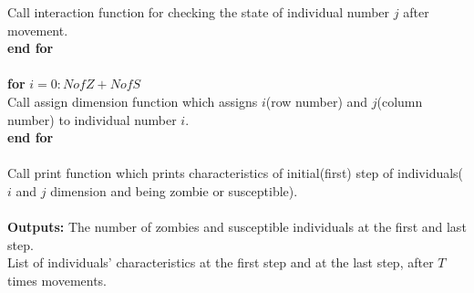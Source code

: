 \documentclass[12pt]{article}
\newcommand\tab[1][1cm]{\hspace*{#1}}
\begin{document}
\tab Call interaction function for checking the state of individual number $j$ \tab after movement.\\
\textbf{end for}\\\\
\textbf{for} $i=0:NofZ+NofS$\\
\tab Call assign dimension function which assigns $i$(row number) and $j$(column \tab number) to individual number $i$.\\
\textbf{end for}\\\\
Call print function which prints characteristics of initial(first) step of individuals($i$ and $j$ dimension and being zombie or susceptible).\\\\
\textbf{Outputs:} The number of zombies and susceptible individuals at the first and last step.\\
List of individuals' characteristics at the first step and at the last step, after $T$ times movements.\\
\end{document}
